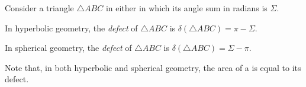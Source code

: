 \documentclass[12pt]{article}
\begin{document}
Consider a triangle $\triangle ABC$ in either  in which its angle sum in radians is $\Sigma$.

In hyperbolic geometry, the \emph{defect} of $\triangle ABC$ is $\delta(\triangle ABC)=\pi-\Sigma$.

In spherical geometry, the \emph{defect} of $\triangle ABC$ is $\delta(\triangle ABC)=\Sigma-\pi$.

Note that, in both hyperbolic and spherical geometry, the area of a  is equal to its defect.
\end{document}

